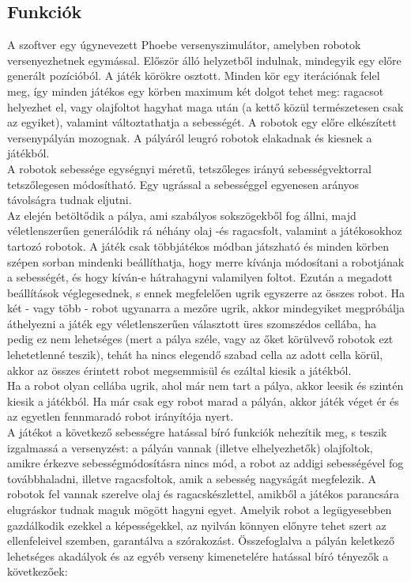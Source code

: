 \subsection{Funkciók}

A szoftver egy úgynevezett Phoebe versenyszimulátor, amelyben robotok versenyezhetnek egymással. Először álló helyzetből indulnak, mindegyik egy előre generált pozícióból. A játék körökre osztott. Minden kör egy iterációnak felel meg, így minden játékos egy körben maximum két dolgot tehet meg: ragacsot helyezhet el, vagy olajfoltot hagyhat maga után (a kettő közül természetesen csak az egyiket), valamint változtathatja a sebességét. A robotok egy előre elkészített versenypályán mozognak. A pályáról leugró robotok elakadnak és kiesnek a játékból.\\

A robotok sebessége egységnyi méretű, tetszőleges irányú sebességvektorral tetszőlegesen módosítható. Egy ugrással a sebességgel egyenesen arányos távolságra tudnak eljutni.\\

Az elején betöltődik a pálya, ami szabályos sokszögekből fog állni, majd véletlenszerűen generálódik rá néhány olaj -és ragacsfolt, valamint a játékosokhoz tartozó robotok. A játék csak többjátékos módban játszható és minden körben szépen sorban mindenki beállíthatja, hogy merre kívánja módosítani a robotjának a sebességét, és hogy kíván-e hátrahagyni valamilyen foltot. Ezután a megadott beállítások véglegesednek, s ennek megfelelően ugrik egyszerre az összes robot. Ha két - vagy több - robot ugyanarra a mezőre ugrik, akkor mindegyiket megpróbálja áthelyezni a játék egy véletlenszerűen választott üres szomszédos cellába, ha pedig ez nem lehetséges (mert a pálya széle, vagy az őket körülvevő robotok ezt lehetetlenné teszik), tehát ha nincs elegendő szabad cella az adott cella körül, akkor az összes érintett robot megsemmisül és ezáltal kiesik a játékból.\\

Ha a robot olyan cellába ugrik, ahol már nem tart a pálya, akkor leesik és szintén kiesik a játékból. Ha már csak egy robot marad a pályán, akkor játék véget ér és az egyetlen fennmaradó robot irányítója nyert.\\

A játékot a következő sebességre hatással bíró funkciók nehezítik meg, s teszik izgalmassá a versenyzést: a pályán vannak (illetve elhelyezhetők) olajfoltok, amikre érkezve sebességmódosításra nincs mód, a robot az addigi sebességével fog továbbhaladni, illetve ragacsfoltok, amik a sebesség nagyságát megfelezik. A robotok fel vannak szerelve olaj és ragacskészlettel, amikből a játékos parancsára elugráskor tudnak maguk mögött hagyni egyet. Amelyik robot a legügyesebben gazdálkodik ezekkel a képességekkel, az nyilván könnyen előnyre tehet szert az ellenfeleivel szemben, garantálva a szórakozást. Összefoglalva a pályán keletkező lehetséges akadályok és az egyéb verseny kimenetelére hatással bíró tényezők a következőek:\\

